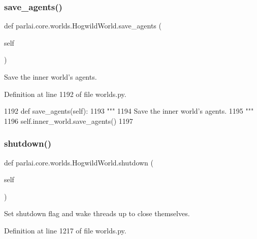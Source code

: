 \subsubsection{\texorpdfstring{save\+\_\+agents()}{save\_agents()}}
{\footnotesize\ttfamily def parlai.\+core.\+worlds.\+Hogwild\+World.\+save\+\_\+agents (\begin{DoxyParamCaption}\item[{}]{self }\end{DoxyParamCaption})}

\begin{DoxyVerb}Save the inner world's agents.
\end{DoxyVerb}
 

Definition at line 1192 of file worlds.\+py.


\begin{DoxyCode}
1192     \textcolor{keyword}{def }save\_agents(self):
1193         \textcolor{stringliteral}{"""}
1194 \textcolor{stringliteral}{        Save the inner world's agents.}
1195 \textcolor{stringliteral}{        """}
1196         self.inner\_world.save\_agents()
1197 
\end{DoxyCode}
\mbox{\label{classparlai_1_1core_1_1worlds_1_1HogwildWorld_a3960deb08a179884b1eea2e423437db2}} 
\subsubsection{\texorpdfstring{shutdown()}{shutdown()}}
{\footnotesize\ttfamily def parlai.\+core.\+worlds.\+Hogwild\+World.\+shutdown (\begin{DoxyParamCaption}\item[{}]{self }\end{DoxyParamCaption})}

\begin{DoxyVerb}Set shutdown flag and wake threads up to close themselves.
\end{DoxyVerb}
 

Definition at line 1217 of file worlds.\+py.


